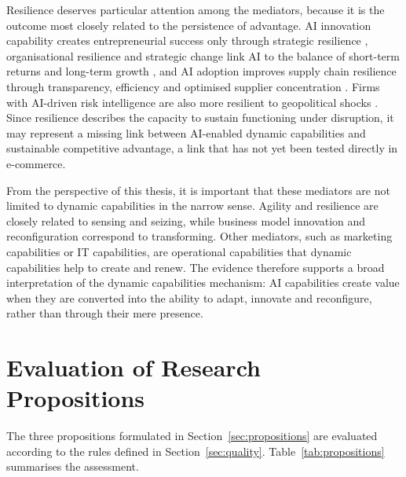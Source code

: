 Resilience deserves particular attention among the mediators, because it is the outcome most closely related to the persistence of advantage. AI innovation capability creates entrepreneurial success only through strategic resilience \parencite[1]{wang2026}, organisational resilience and strategic change link AI to the balance of short-term returns and long-term growth \parencite[1]{liang2026}, and AI adoption improves supply chain resilience through transparency, efficiency and optimised supplier concentration \parencite[1]{dai2026}. Firms with AI-driven risk intelligence are also more resilient to geopolitical shocks \parencite[1]{slrR096}. Since resilience describes the capacity to sustain functioning under disruption, it may represent a missing link between AI-enabled dynamic capabilities and sustainable competitive advantage, a link that has not yet been tested directly in e-commerce.

From the perspective of this thesis, it is important that these mediators are not limited to dynamic capabilities in the narrow sense. Agility and resilience are closely related to sensing and seizing, while business model innovation and reconfiguration correspond to transforming. Other mediators, such as marketing capabilities or IT capabilities, are operational capabilities that dynamic capabilities help to create and renew. The evidence therefore supports a broad interpretation of the dynamic capabilities mechanism: AI capabilities create value when they are converted into the ability to adapt, innovate and reconfigure, rather than through their mere presence.

\section{Evaluation of Research Propositions}
\label{sec:proposition-evaluation}

The three propositions formulated in Section~\ref{sec:propositions} are evaluated according to the rules defined in Section~\ref{sec:quality}. Table~\ref{tab:propositions} summarises the assessment.

